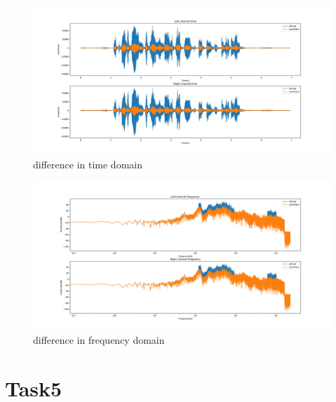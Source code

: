 \documentclass[a4paper,12pt]{article}
\begin{document}
\begin{figure}[h]   
	\centering 
	\includegraphics[width=12cm]{../Output/Figures/recordTR.pdf} 
	\caption{difference in time domain}   
	\label{fig_recordTR}
\end{figure}
\begin{figure}[h]   
	\centering 
	\includegraphics[width=12cm]{../Output/Figures/recordFR.pdf} 
	\caption{difference in frequency domain}   
	\label{fig_recordFR}
\end{figure}

\clearpage
\section{Task5}
\end{document}
